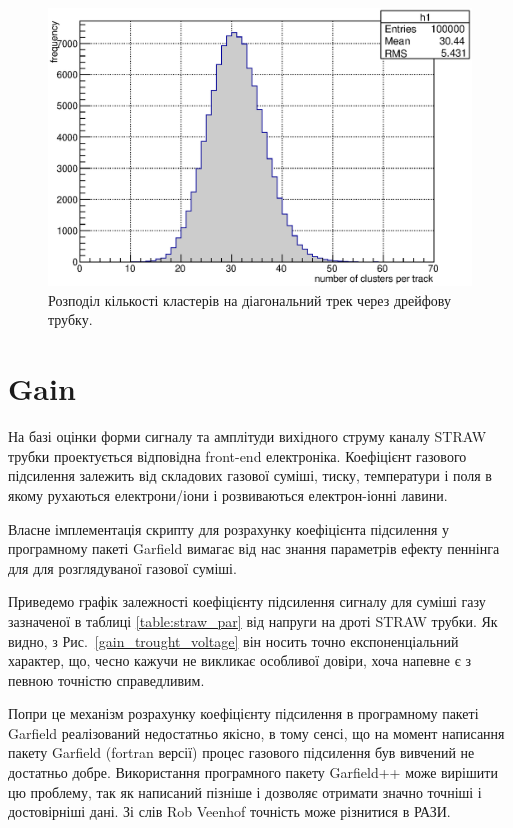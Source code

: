 \documentclass[]{article}
\begin{document}
	 \begin{figure}[h]
	 \includegraphics[width=\textwidth]{cluster_distrib}
	 \caption{ Розподіл кількості кластерів на діагональний трек через дрейфову трубку.}
	 \label{fig:n_cluster_distr}
	 \end{figure} 
		 
	 
	\section{Gain}
	На базі оцінки форми сигналу та амплітуди вихідного струму каналу STRAW трубки проектується відповідна front-end електроніка. Коефіцієнт газового підсилення залежить від складових газової суміші, тиску, температури і поля в якому рухаються електрони/іони і розвиваються електрон-іонні лавини.
	
	Власне імплементація скрипту для розрахунку коефіцієнта підсилення у програмному пакеті Garfield вимагає від нас знання параметрів ефекту пеннінга для \cite{} для розглядуваної газової суміші.
	
	Приведемо графік залежності коефіцієнту підсилення сигналу для суміші газу зазначеної в таблиці \ref{table:straw_par} від напруги на дроті STRAW трубки.  Як видно, з Рис.~\ref{gain_trought_voltage} він носить точно експоненціальний характер, що, чесно кажучи не викликає особливої довіри, хоча напевне є з певною точністю справедливим. 
	
	Попри це механізм розрахунку коефіцієнту підсилення в програмному пакеті Garfield реалізований недостатньо якісно, в тому сенсі, що на момент написання пакету Garfield (fortran версії) процес газового підсилення був вивчений не достатньо добре. Використання програмного пакету Garfield++ може вирішити цю проблему, так як написаний пізніше і дозволяє отримати значно точніші і достовірніші дані. Зі слів Rob Veenhof точність може різнитися в РАЗИ.
	
\end{document}
